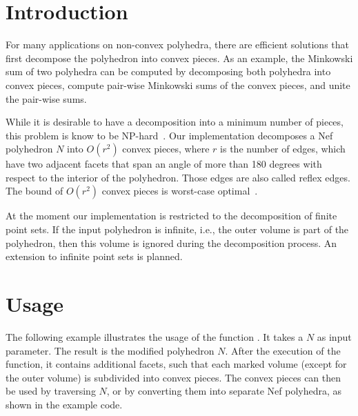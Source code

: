 
\ccParDims


%

\section{Introduction}

For many applications on non-convex polyhedra, there are efficient
solutions that first decompose the polyhedron into convex pieces. As
an example, the Minkowski sum of two polyhedra can be computed by
decomposing both polyhedra into convex pieces, compute pair-wise
Minkowski sums of the convex pieces, and unite the pair-wise sums.

While it is desirable to have a decomposition into a minimum number of
pieces, this problem is know to be NP-hard~\cite{cgal:c--}. Our
implementation decomposes a Nef polyhedron $N$ into $O(r^2)$ convex
pieces, where $r$ is the number of edges, which have two adjacent
facets that span an angle of more than 180 degrees with respect to the
interior of the polyhedron. Those edges are also called reflex edges.
The bound of $O(r^2)$ convex pieces is worst-case
optimal~\cite{cgal:c--}.

At the moment our implementation is restricted to the decomposition of
finite point sets. If the input polyhedron is infinite, i.e., the
outer volume is part of the polyhedron, then this volume is ignored
during the decomposition process. An extension to infinite point sets
is planned.

\section{Usage}

The following example illustrates the usage of the function
. It takes a 
$N$ as input parameter. The result is the modified polyhedron $N$.
After the execution of the function, it contains additional facets,
such that each marked volume (except for the outer volume) is
subdivided into convex pieces. The convex pieces can then be used by
traversing $N$, or by converting them into separate Nef polyhedra, as
shown in the example code.

